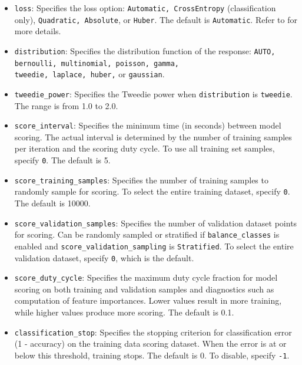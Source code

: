 {{\begin{itemize}
\item \texttt{loss}: Specifies the loss option: \texttt{Automatic, CrossEntropy} (classification only), \texttt{Quadratic, Absolute}, or \texttt{Huber}. The default is \texttt{Automatic}. Refer to {\textbf{}} for more details.

\item \texttt{distribution}: Specifies the distribution function of the response: \texttt{AUTO, bernoulli, multinomial, poisson, gamma, \\ tweedie, laplace, huber,} or \texttt{gaussian}. 

\item \texttt{tweedie\_power}: Specifies the Tweedie power when \texttt{distribution} is  \texttt{tweedie}. The range is from 1.0 to 2.0. 

\item \texttt{score\_interval}: Specifies the minimum time (in seconds) between model scoring. The actual interval is determined by the number of training samples per iteration and the scoring duty cycle. To use all training set samples, specify \texttt{0}. The default is 5.

\item \texttt{score\_training\_samples}: Specifies the number of training samples to randomly sample for scoring. To select the entire training dataset, specify \texttt{0}.  The default is 10000.

\item \texttt{score\_validation\_samples}: Specifies the number of validation dataset points for scoring. Can be randomly sampled or stratified if  \texttt{balance\_classes} is enabled and \texttt{score\_validation\_sampling} is \texttt{Stratified}. To select the entire validation dataset, specify \texttt{0}, which is the default.

\item \texttt{score\_duty\_cycle}: Specifies the maximum duty cycle fraction for model scoring on both training and validation samples and diagnostics such as computation of feature importances. Lower values result in more training, while higher values produce more scoring. The default is 0.1.

\item \texttt{classification\_stop}: Specifies the stopping criterion for classification error (1 - accuracy) on the training data scoring dataset.  When the error is at or below this threshold, training stops.  The default is 0.  To disable, specify \texttt{-1}. 


\end{itemize}}}
